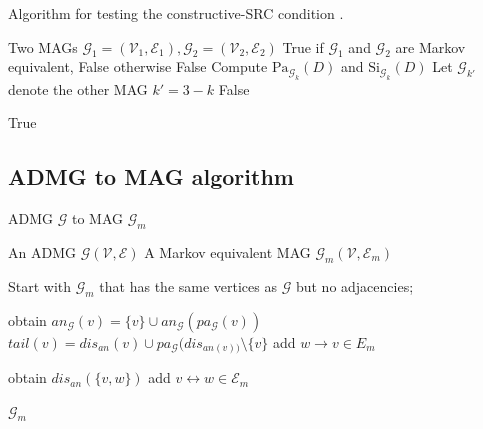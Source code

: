 \documentclass[a4paper]{article}
\begin{document}
\begin{algorithm}
	\caption{Algorithm for testing the constructive-SRC condition \cite{wienobst2022}.}
	\label{alg:wienobst}
	\begin{algorithmic}[1]
		\renewcommand{\algorithmicrequire}{\textbf{Input:}}
		\renewcommand{\algorithmicensure}{\textbf{Output:}}
		\Require Two MAGs $\mathcal{G}_1 = (\mathcal{V}_1, \mathcal{E}_1), \mathcal{G}_2 = (\mathcal{V}_2, \mathcal{E}_2)$
		\Ensure True if $\mathcal{G}_1$ and $\mathcal{G}_2$ are Markov equivalent, False otherwise
		\Return False
		\EndIf
		\State Compute $\text{Pa}_{\mathcal{G}_k}(D)$ and $\text{Si}_{\mathcal{G}_k}(D)$
		\State Let $\mathcal{G}_{k'}$ denote the other MAG
		\State $k' = 3 - k$
		\Return False
		\EndIf
		\EndFor
		\EndIf
		\EndFor
		\EndFor
		\EndFor
		
		\Return True
	\end{algorithmic}
\end{algorithm}

\newpage

\subsection{ADMG to MAG algorithm}

\begin{algorithm}
	\caption{ADMG $\mathcal{G}$ to MAG $\mathcal{G}_m$}
	\label{alg:admg-mag}
	\begin{algorithmic}[1]
		\renewcommand{\algorithmicrequire}{\textbf{Input:}}
		\renewcommand{\algorithmicensure}{\textbf{Output:}}
		\Require An ADMG $\mathcal{G}(\mathcal{V}, \mathcal{E})$
		\Ensure A Markov equivalent MAG $\mathcal{G}_m(\mathcal{V}, \mathcal{E}_m)$
		
		\State Start with $\mathcal{G}_m$ that has the same vertices as $\mathcal{G}$ but no adjacencies;
		
		\State obtain $an_{\mathcal{G}}(v) = \{v\} \cup an_{\mathcal{G}}(pa_{\mathcal{G}}(v))$
		\State $tail(v) = dis_{an}(v) \cup pa_\mathcal{G}(dis_{an(v))} \setminus \{v\}$
		\State add $w \to v \in E_m$
		\EndFor
		\EndFor
		
		\State obtain $dis_{an}(\{v,w\})$
		\State add $v \leftrightarrow w \in \mathcal{E}_m$
		\EndIf
		\EndFor
		
		\Return $\mathcal{G}_m$
	\end{algorithmic}
\end{algorithm}
\end{document}
